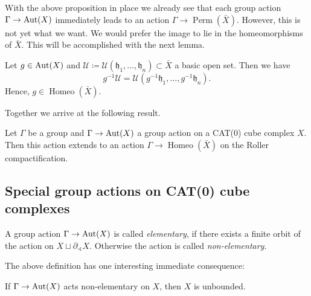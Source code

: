 With the above proposition in place we already see that each group action \(\Gamma \to \operatorname{Aut}(X)\) immediately leads to an action \(\Gamma \to \operatorname{Perm}(\bar X)\). However, this is not yet what we want. We would prefer the image to lie in the homeomorphisms of \(\bar X\). This will be accomplished with the next lemma.

\begin{lemma}
  Let \(g \in \operatorname{Aut}(X)\) and \(\mathcal{U} \coloneqq \mathcal{U}(\mathfrak{h}_1, \dots, \mathfrak{h}_n) \subset \bar X\) a basic open set. Then we have
  \[
    g^{-1} \mathcal{U} = \mathcal{U}(g^{-1}\mathfrak{h}_1, \dots, g^{-1}\mathfrak{h}_n).
  \]
  Hence, \(g \in \operatorname{Homeo}(\bar X)\).
\end{lemma}

Together we arrive at the following result.

\begin{thm}
  \label{thm:roller-action}
  Let \(\Gamma\) be a group and \(\Gamma \to \operatorname{Aut}(X)\) a group action on a CAT(0) cube complex \(X\). Then this action extends to an action \(\Gamma \to \operatorname{Homeo}(\bar X)\) on the Roller compactification.
\end{thm}

\subsection{Special group actions on CAT(0) cube complexes}
\label{sec:special}

\begin{defin}
  A group action \(\Gamma \to \operatorname{Aut}(X)\) is called \emph{elementary}, if there exists a finite orbit of the action on \(X \sqcup \partial_{\sphericalangle}X\). Otherwise the action is called \emph{non-elementary}.
\end{defin}


The above definition has one interesting immediate consequence:
\begin{prop}
  \label{prop:ne-unbounded}
  If \(\Gamma \to \operatorname{Aut}(X)\) acts non-elementary on \(X\), then \(X\) is unbounded.
\end{prop}

